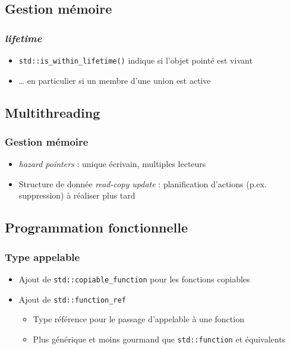 \documentclass[C++.tex]{subfiles}
\begin{document}
\subsection*{Gestion mémoire}
\begin{frame}[fragile]
	\frametitle{\textit{lifetime}}
	\begin{itemize}
		\item \lstinline|std::is_within_lifetime()| indique si l'objet pointé est vivant
		\item \ldots{} en particulier si un membre d'une union est active
	\end{itemize}
\end{frame}

\subsection*{Multithreading}
\begin{frame}[fragile]
	\frametitle{Gestion mémoire}
	\begin{itemize}
		\item \textit{hazard pointers} : unique écrivain, multiples lecteurs
		\item Structure de donnée \textit{read-copy update} : planification d'actions (p.ex. suppression) à réaliser plus tard
	\end{itemize}
\end{frame}

\subsection*{Programmation fonctionnelle}
\begin{frame}[fragile]
	\frametitle{Type appelable}
	\begin{itemize}
		\item Ajout de \lstinline|std::copiable_function| pour les fonctions copiables


		\item Ajout de \lstinline|std::function_ref|
		\begin{itemize}
			\item Type référence pour le passage d'appelable à une fonction
			\item Plus générique et moins gourmand que \lstinline|std::function| et équivalents
	
		\end{itemize}
	\end{itemize}
\end{frame}
\end{document}
